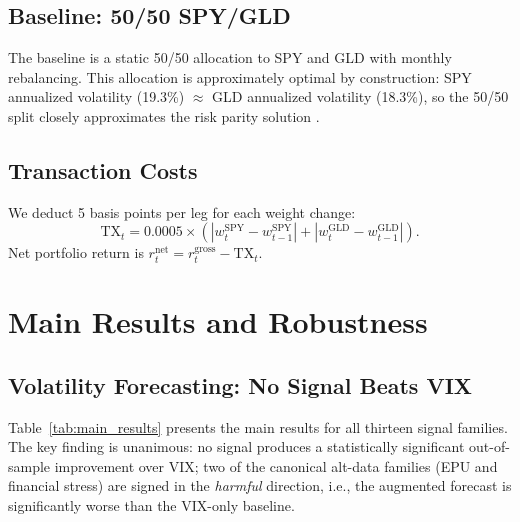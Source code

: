 \documentclass[12pt,a4paper]{article}
\begin{document}
\subsection{Baseline: 50/50 SPY/GLD}

The baseline is a static 50/50 allocation to SPY and GLD with monthly rebalancing. This allocation is approximately optimal by construction: SPY annualized volatility (19.3\%) $\approx$ GLD annualized volatility (18.3\%), so the 50/50 split closely approximates the risk parity solution \citep{maillard2010}.

\subsection{Transaction Costs}

We deduct 5 basis points per leg for each weight change:
\begin{equation}
\text{TX}_t = 0.0005 \times \left(|w_t^{\text{SPY}} - w_{t-1}^{\text{SPY}}| + |w_t^{\text{GLD}} - w_{t-1}^{\text{GLD}}|\right).
\label{eq:tx}
\end{equation}
Net portfolio return is $r_t^{\text{net}} = r_t^{\text{gross}} - \text{TX}_t$.


\section{Main Results and Robustness}
\label{sec:results}

\subsection{Volatility Forecasting: No Signal Beats VIX}

Table~\ref{tab:main_results} presents the main results for all thirteen signal families. The key finding is unanimous: no signal produces a statistically significant out-of-sample improvement over VIX; two of the canonical alt-data families (EPU and financial stress) are signed in the \emph{harmful} direction, i.e., the augmented forecast is significantly worse than the VIX-only baseline.
\end{document}
